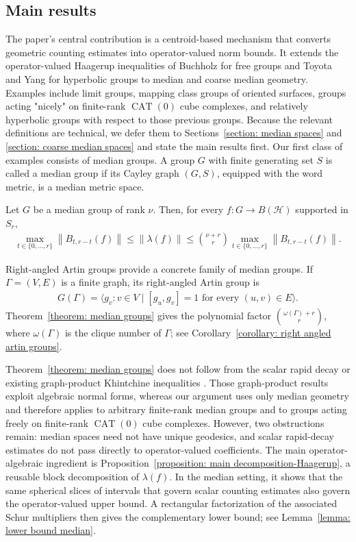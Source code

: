 \documentclass[12pt,reqno]{amsart}
\newcommand{\norm}[1]{\left\|#1\right\|}
\newcommand{\Hil}{\mathcal{H}}
\newcommand{\CAT}{\operatorname{CAT}(0)}
\numberwithin{equation}{section}
\begin{document}
\subsection{Main results}
The paper's central contribution is a centroid-based mechanism that converts geometric counting estimates into operator-valued norm bounds. It extends the operator-valued Haagerup inequalities of Buchholz for free groups and Toyota and Yang for hyperbolic groups to median and coarse median geometry. Examples include limit groups, mapping class groups of oriented surfaces, groups acting "nicely" on finite-rank $\CAT$ cube complexes, and relatively hyperbolic groups with respect to those previous groups.
Because the relevant definitions are technical, we defer them to Sections~\ref{section: median spaces} and \ref{section: coarse median spaces} and state the main results first.
Our first class of examples consists of median groups. A group $G$ with finite generating set $S$ is called a median group if its Cayley graph $(G, S)$, equipped with the word metric, is a median metric space.
\begin{theorem}\label{theorem: median groups}
    Let $G$ be a median group of rank $\nu$. Then, for every $f:G\to B(\Hil)$ supported in $S_r$,
    \begin{align*}
        \max_{t\in \{0,\ldots, r\}}\norm{B_{t,r-t}(f)}\le \norm{\lambda(f)}\le \binom{\nu+r}{r}\max_{t\in \{0,\ldots, r\}}\norm{B_{t,r-t}(f)}.
    \end{align*}
\end{theorem}
Right-angled Artin groups provide a concrete family of median groups. If $\Gamma=(V,E)$ is a finite graph, its right-angled Artin group is
\begin{align*}
    G(\Gamma)=\langle g_v: v\in V\mid [g_u,g_v]=1\text{ for every }(u,v)\in E\rangle.
\end{align*}
Theorem~\ref{theorem: median groups} gives the polynomial factor $\binom{\omega(\Gamma)+r}{r}$, where $\omega(\Gamma)$ is the clique number of $\Gamma$; see Corollary~\ref{corollary: right angled artin groups}.

Theorem~\ref{theorem: median groups} does not follow from the scalar rapid decay or existing graph-product Khintchine inequalities \cite{CaspersKlisseLarsen2021graphproduct}. Those graph-product results exploit algebraic normal forms, whereas our argument uses only median geometry and therefore applies to arbitrary finite-rank median groups and to groups acting freely on finite-rank $\CAT$ cube complexes. However, two obstructions remain: median spaces need not have unique geodesics, and scalar rapid-decay estimates do not pass directly to operator-valued coefficients. The main operator-algebraic ingredient is Proposition~\ref{proposition: main decomposition-Haagerup}, a reusable block decomposition of $\lambda(f)$. In the median setting, it shows that the same spherical slices of intervals that govern scalar counting estimates also govern the operator-valued upper bound. A rectangular factorization of the associated Schur multipliers then gives the complementary lower bound; see Lemma~\ref{lemma: lower bound median}.
\end{document}
